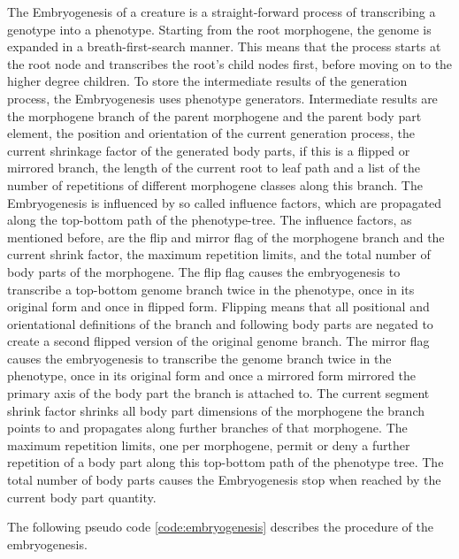 \documentclass[main]{subfiles}
\begin{document}
The Embryogenesis of a creature is a straight-forward process of transcribing a genotype into a phenotype. %
%
Starting from the root morphogene, the genome is expanded in a breath-first-search manner. %
%
This means that the process starts at the root node and transcribes the root's child nodes first, before moving on to the higher degree children. %
%
To store the intermediate results of the generation process, the Embryogenesis uses phenotype generators. %
%
Intermediate results are the morphogene branch of the parent morphogene and the parent body part element, the position and orientation of the current generation process, the current shrinkage factor of the generated body parts, if this is a flipped or mirrored branch, the length of the current root to leaf path and a list of the number of repetitions of different morphogene classes along this branch. %
%
The Embryogenesis is influenced by so called influence factors, which are propagated along the top-bottom path of the phenotype-tree. %
%
The influence factors, as mentioned before, are the flip and mirror flag of the morphogene branch and the current shrink factor, the maximum repetition limits, and the total number of body parts of the morphogene. %
%
The flip flag causes the embryogenesis to transcribe a top-bottom genome branch twice in the phenotype, once in its original form and once in flipped form. %
%
Flipping means that all positional and orientational definitions of the branch and following body parts are negated to create a second flipped version of the original genome branch. %
%
The mirror flag causes the embryogenesis to transcribe the genome branch twice in the phenotype, once in its original form and once a mirrored form mirrored the primary axis of the body part the branch is attached to. %
%
The current segment shrink factor shrinks all body part dimensions of the morphogene the branch points to and propagates along further branches of that morphogene. %
%
The maximum repetition limits, one per morphogene, permit or deny a further repetition of a body part along this top-bottom path of the phenotype tree. %
%
The total number of body parts causes the Embryogenesis stop when reached by the current body part quantity. %

The following pseudo code \ref{code:embryogenesis} describes the procedure of the embryogenesis. %
\end{document}
